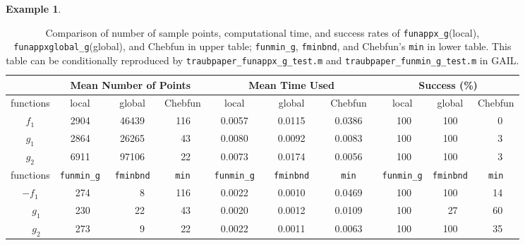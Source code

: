 \documentclass[review]{elsarticle}
\theoremstyle{definition}
\newtheorem{exmp}{Example}
\newcommand{\funappxg}{\texttt{funappx\_g}\xspace}
\newcommand{\funappxglobalg}{\texttt{funappxglobal\_g}\xspace}
\newcommand{\funming}{\texttt{funmin\_g}\xspace}
\newcommand{\fminbnd}{\texttt{fminbnd}\xspace}
\begin{document}
\begin{exmp}
%
\begin{table}[bt]
\centering
\caption{Comparison of number of sample points, computational time,  and success
rates of \funappxg (local), \funappxglobalg (global), and Chebfun in upper table;
\funming, \fminbnd, and Chebfun's \texttt{min} in lower table.
This table can be conditionally reproduced by
\texttt{traubpaper\_funappx\_g\_test.m} and \texttt{traubpaper\_funmin\_g\_test.m}  in GAIL.}
\label{tab:localVsGlobalVsChebfun}
{\footnotesize
\setlength{\tabcolsep}{.15 em} %
		\begin{tabular}{ccrccrccrccrccrccrccrccrccrc}	
		 \hline	
			               &    \multicolumn{9}{c}{\bf Mean Number of Points}   & \multicolumn{9}{c}{\bf Mean Time Used}  & \multicolumn{9}{c}{\bf Success (\%)}
	  \\ \hline  functions &  \multicolumn{3}{c}{local}  &  \multicolumn{3}{c}{global }  &  \multicolumn{3}{c}{Chebfun }  & \multicolumn{3}{c}{local}  &  \multicolumn{3}{c}{global }  &  \multicolumn{3}{c}{Chebfun } & \multicolumn{3}{c}{local}  &  \multicolumn{3}{c}{global }  &  \multicolumn{3}{c}{Chebfun }
\\ \toprule
          $f_1$   &&   2904  &&&   46439   &&&   116    &&&   0.0057   &&&     0.0115    &&&   0.0386 &&&    100   &&&  100   &&&  0
\\        $g_1$   &&   2864  &&&   26265   &&&    43    &&&   0.0080   &&&     0.0092    &&&   0.0083 &&&    100   &&&  100   &&&  3
\\        $g_2$   &&   6911  &&&   97106   &&&    22    &&&   0.0073   &&&     0.0174    &&&   0.0056 &&&    100   &&&  100    &&&  3  	
\\ \hline

			 functions &  \multicolumn{3}{c}{\funming} &  \multicolumn{3}{c}{\fminbnd}  &  \multicolumn{3}{c}{\texttt{min}}
		  &  \multicolumn{3}{c}{\funming}  &  \multicolumn{3}{c}{\fminbnd }  &  \multicolumn{3}{c}{\texttt{min} }  &  \multicolumn{3}{c}{\funming} & \multicolumn{3}{c}{\fminbnd} & \multicolumn{3}{c}{\texttt{min}}
			\\ \toprule
			$-f_1$   &&  274   &&&   8   &&&  116     &&&   0.0022   &&&   0.0010    &&& 0.0469  &&&   100   &&&  100   &&&  14
			\\ $\phantom{-}g_1$   && 230 &&&  22   &&&    43    &&& 0.0020  &&&    0.0012   &&&  0.0109 &&&    100   &&&   27   &&&  60
			\\ $\phantom{-}g_2$   &&  273 &&&   9   &&&   22    &&&  0.0022   &&&   0.0011    &&&  0.0063 &&&    100   &&& 100   &&&  35
			\\ \hline
		\end{tabular}
}
\end{table}
%


\end{exmp}
\end{document}
